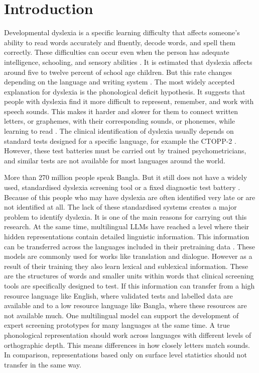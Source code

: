 \documentclass[preprint,12pt]{elsarticle}
\begin{document}
\section{Introduction}
\label{sec:intro}
Developmental dyslexia is a specific learning difficulty that affects someone's ability to read words accurately and fluently, decode words, and spell them correctly. These difficulties can occur even when the person has adequate intelligence, schooling, and sensory abilities \cite{snowling2020dyslexia,peterson2012developmental}. It is estimated that dyslexia affects around five to twelve percent of school age children. But this rate changes depending on the language and writing system \cite{ziegler2005reading,wagner2020prevalence}. The most widely accepted explanation for dyslexia is the phonological deficit hypothesis. It suggests that people with dyslexia find it more difficult to represent, remember, and work with speech sounds.
This makes it harder and slower for them to connect written letters, or graphemes, with their corresponding sounds, or phonemes, while learning to read \cite{snowling2020dyslexia,goswami2011temporal}.
The clinical identification of dyslexia usually depends on standard tests designed for a specific language, for example the CTOPP-2 \cite{wagner2013ctopp}. However, these test batteries must be carried out by trained psychometricians, and similar tests are not available for most languages around the world.

More than 270 million people speak Bangla. But it still does not have a widely used, standardised dyslexia screening tool or a fixed diagnostic test battery \cite{nag2014dyslexia,nag2017indian,badsha2024mall}. Because of this people who may have dyslexia are often identified very late or are not identified at all. The lack of these standardised systems creates a major problem to identify dyslexia. It is one of the main reasons for carrying out this research.
At the same time, multilingual LLMs have reached a level where their hidden representations contain detailed linguistic information. This information can be transferred across the languages included in their pretraining data \cite{conneau2020xlmr,scao2022bloom,xue2021mt5}. These models are commonly used for works like translation and dialogue. However as a result of their training they also learn lexical and sublexical information. These are the structures of words and smaller units within words that clinical screening tools are specifically designed to test.
If this information can transfer from a high resource language like English, where validated tests and labelled data are available and to a low resource language like Bangla, where these resources are not available much. One multilingual model can support the development of expert screening prototypes for many languages at the same time. A true phonological representation should work across languages with different levels of orthographic depth. This means differences in how closely letters match sounds. In comparison, representations based only on surface level statistics should not transfer in the same way.
\end{document}
